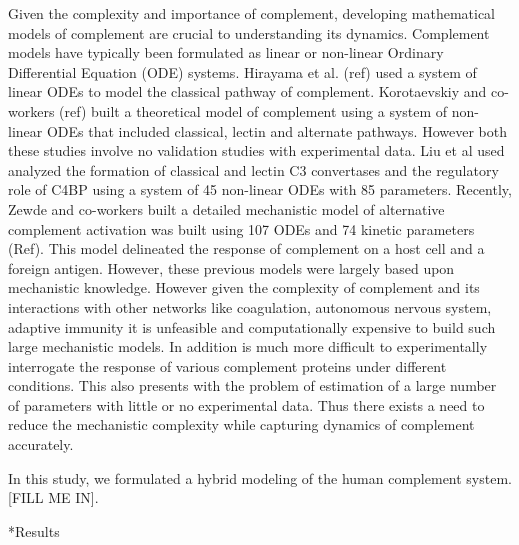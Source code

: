 \documentclass[12pt]{article}
\makeatletter
\renewcommand\section{\@startsection
	{subsection}{2}{0mm}
	{-0.2in}
	{0.05\baselineskip}
	{\normalfont\large\bfseries}}
\makeatother
\begin{document}
Given the complexity and importance of complement, developing mathematical models of complement are crucial to understanding its dynamics. Complement models have typically been formulated as linear or non-linear Ordinary Differential Equation (ODE) systems. Hirayama  et al. (ref) used a system of linear ODEs to model the classical pathway of complement. Korotaevskiy and co-workers (ref) built a theoretical model of complement using a system of non-linear ODEs that included classical, lectin and alternate pathways. However both these studies involve no validation studies with experimental data. Liu et al used analyzed the formation of classical and lectin C3 convertases and the regulatory role of C4BP using a system of 45 non-linear ODEs with 85 parameters.  Recently, Zewde and co-workers built a detailed mechanistic model of alternative complement activation was built using 107 ODEs and 74 kinetic parameters (Ref). This model delineated the response of complement on a host cell and a foreign antigen. However, these previous models were largely based upon mechanistic knowledge.  However given the complexity of complement and its interactions with other networks like coagulation, autonomous nervous system, adaptive immunity it is unfeasible and computationally expensive to build such large mechanistic models. In addition is much more difficult to experimentally interrogate the response of various complement proteins under different conditions. This also presents with the problem of estimation of a large number of parameters with little or no experimental data. Thus there exists a need to reduce the mechanistic complexity while capturing dynamics of complement accurately.

In this study, we formulated a hybrid modeling of the human complement system. [FILL ME IN].

\clearpage

\section*{Results}
\end{document}
